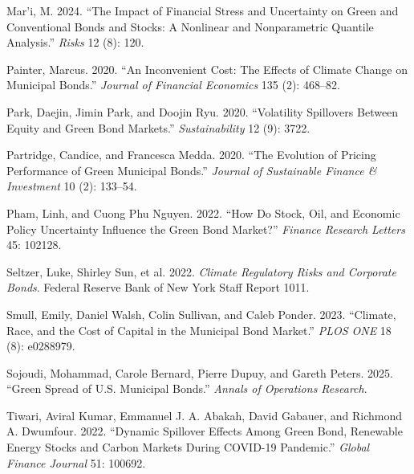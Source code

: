 \documentclass[
  11pt,
]{article}
\newlength{\cslhangindent}
\newenvironment{CSLReferences}[2] %
 {\begin{list}{}{%
  \setlength{\itemindent}{0pt}
  \setlength{\leftmargin}{0pt}
  \setlength{\parsep}{0pt}
  \ifodd #1
   \setlength{\leftmargin}{\cslhangindent}
   \setlength{\itemindent}{-1\cslhangindent}
  \fi
  \setlength{\itemsep}{#2\baselineskip}}}
 {\end{list}}
\begin{document}
\begin{CSLReferences}{1}{1}
Mar'i, M. 2024. {``The Impact of Financial Stress and Uncertainty on
Green and Conventional Bonds and Stocks: A Nonlinear and Nonparametric
Quantile Analysis.''} \emph{Risks} 12 (8): 120.

Painter, Marcus. 2020. {``An Inconvenient Cost: The Effects of Climate
Change on Municipal Bonds.''} \emph{Journal of Financial Economics} 135
(2): 468--82.

Park, Daejin, Jimin Park, and Doojin Ryu. 2020. {``Volatility Spillovers
Between Equity and Green Bond Markets.''} \emph{Sustainability} 12 (9):
3722.

Partridge, Candice, and Francesca Medda. 2020. {``The Evolution of
Pricing Performance of Green Municipal Bonds.''} \emph{Journal of
Sustainable Finance \& Investment} 10 (2): 133--54.

Pham, Linh, and Cuong Phu Nguyen. 2022. {``How Do Stock, Oil, and
Economic Policy Uncertainty Influence the Green Bond Market?''}
\emph{Finance Research Letters} 45: 102128.

{Seltzer, Luke, Shirley Sun, et al.} 2022. \emph{Climate Regulatory
Risks and Corporate Bonds}. Federal Reserve Bank of New York Staff
Report 1011.

Smull, Emily, Daniel Walsh, Colin Sullivan, and Caleb Ponder. 2023.
{``Climate, Race, and the Cost of Capital in the Municipal Bond
Market.''} \emph{PLOS ONE} 18 (8): e0288979.

Sojoudi, Mohammad, Carole Bernard, Pierre Dupuy, and Gareth Peters.
2025. {``Green Spread of U.S. Municipal Bonds.''} \emph{Annals of
Operations Research}.

Tiwari, Aviral Kumar, Emmanuel J. A. Abakah, David Gabauer, and Richmond
A. Dwumfour. 2022. {``Dynamic Spillover Effects Among Green Bond,
Renewable Energy Stocks and Carbon Markets During COVID-19 Pandemic.''}
\emph{Global Finance Journal} 51: 100692.

\end{CSLReferences}
\end{document}
